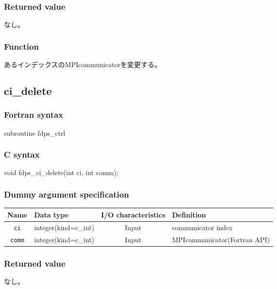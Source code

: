 \subsubsection*{Returned value}
なし。

\subsubsection*{Function}
あるインデックスのMPIcommunicatorを変更する。

\subsection{ci\_delete}
\subsubsection*{Fortran syntax}
\begin{screen}
\begin{spverbatim}
subroutine fdps_ctrl%
\end{spverbatim}
\end{screen}

\subsubsection*{C syntax}
\begin{screen}
\begin{spverbatim}
void fdps_ci_delete(int ci, int comm);
\end{spverbatim}
\end{screen}

\subsubsection*{Dummy argument specification}
\begin{table}[h]
\begin{tabularx}{\linewidth}{cXcX}
\toprule
\rowcolor{Snow2}
Name & Data type & I/O characteristics & Definition \\
\midrule
\verb|ci| & integer(kind=c\_int) & Input & communicator index\\
\verb|comm| & integer(kind=c\_int) & Input & MPIcommunicator(Fortran API)\\
\bottomrule
\end{tabularx}
\end{table}


\subsubsection*{Returned value}
なし。

